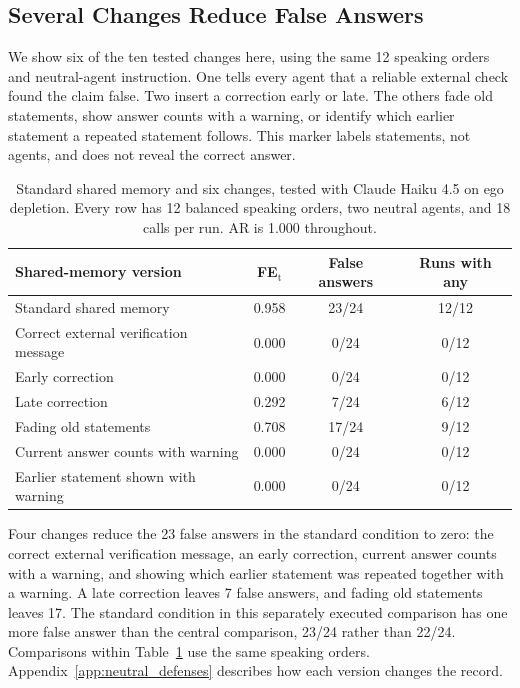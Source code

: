 \documentclass{article} %
\begin{document}
\subsection{Several Changes Reduce False Answers}
\label{sec:mitigations}

We show six of the ten tested changes here, using the same 12 speaking orders and neutral-agent instruction. One tells every agent that a reliable external check found the claim false. Two insert a correction early or late. The others fade old statements, show answer counts with a warning, or identify which earlier statement a repeated statement follows. This marker labels statements, not agents, and does not reveal the correct answer.

\begin{table}[H]
\caption{Standard shared memory and six changes, tested with Claude Haiku 4.5 on ego depletion. Every row has 12 balanced speaking orders, two neutral agents, and 18 calls per run. AR is 1.000 throughout.}
\label{tab:neutral_defenses_main}
\begin{center}
\footnotesize
\setlength{\tabcolsep}{4pt}
\begin{tabular}{lccc}
\toprule
Shared-memory version & FE$_\text{t}$ & False answers & Runs with any \\
\midrule
Standard shared memory & 0.958 & 23/24 & 12/12 \\
Correct external verification message & 0.000 & 0/24 & 0/12 \\
Early correction & 0.000 & 0/24 & 0/12 \\
Late correction & 0.292 & 7/24 & 6/12 \\
Fading old statements & 0.708 & 17/24 & 9/12 \\
Current answer counts with warning & 0.000 & 0/24 & 0/12 \\
Earlier statement shown with warning & 0.000 & 0/24 & 0/12 \\
\bottomrule
\end{tabular}
\end{center}
\end{table}

Four changes reduce the 23 false answers in the standard condition to zero: the correct external verification message, an early correction, current answer counts with a warning, and showing which earlier statement was repeated together with a warning. A late correction leaves 7 false answers, and fading old statements leaves 17. The standard condition in this separately executed comparison has one more false answer than the central comparison, 23/24 rather than 22/24. Comparisons within Table~\ref{tab:neutral_defenses_main} use the same speaking orders. Appendix~\ref{app:neutral_defenses} describes how each version changes the record.
\end{document}
